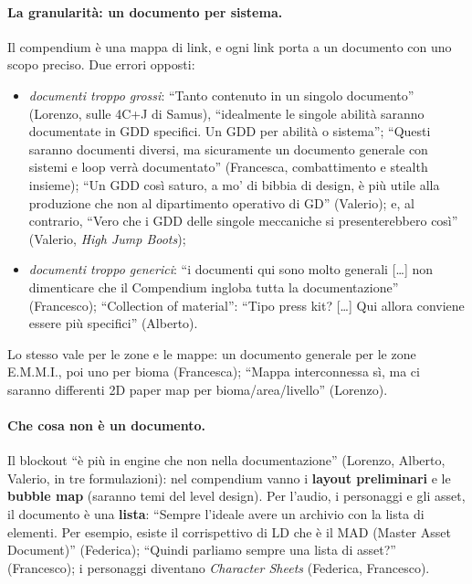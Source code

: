 \paragraph{La granularità: un documento per sistema.} Il compendium è una
mappa di link, e ogni link porta a un documento con uno scopo preciso. Due
errori opposti:
\begin{itemize}
  \item \emph{documenti troppo grossi}: ``Tanto contenuto in un singolo
        documento'' (Lorenzo, sulle 4C+J di Samus), ``idealmente le singole
        abilità saranno documentate in GDD specifici. Un GDD per abilità o
        sistema''; ``Questi saranno documenti diversi, ma sicuramente un
        documento generale con sistemi e loop verrà documentato'' (Francesca,
        combattimento e stealth insieme); ``Un GDD così saturo, a mo' di bibbia
        di design, è più utile alla produzione che non al dipartimento
        operativo di GD'' (Valerio); e, al contrario, ``Vero che i GDD delle
        singole meccaniche si presenterebbero così'' (Valerio, \emph{High Jump
        Boots});
  \item \emph{documenti troppo generici}: ``i documenti qui sono molto
        generali [\dots] non dimenticare che il Compendium ingloba tutta la
        documentazione'' (Francesco); ``Collection of material'': ``Tipo press
        kit? [\dots] Qui allora conviene essere più specifici'' (Alberto).
\end{itemize}
Lo stesso vale per le zone e le mappe: un documento generale per le zone
E.M.M.I., poi uno per bioma (Francesca); ``Mappa interconnessa sì, ma ci
saranno differenti 2D paper map per bioma/area/livello'' (Lorenzo).

\paragraph{Che cosa non è un documento.} Il blockout ``è più in engine che
non nella documentazione'' (Lorenzo, Alberto, Valerio, in tre formulazioni):
nel compendium vanno i \textbf{layout preliminari} e le \textbf{bubble map}
(saranno temi del level design). Per l'audio, i personaggi e gli asset, il
documento è una \textbf{lista}: ``Sempre l'ideale avere un archivio con la
lista di elementi. Per esempio, esiste il corrispettivo di LD che è il MAD
(Master Asset Document)'' (Federica); ``Quindi parliamo sempre una lista di
asset?'' (Francesco); i personaggi diventano \emph{Character Sheets}
(Federica, Francesco).


